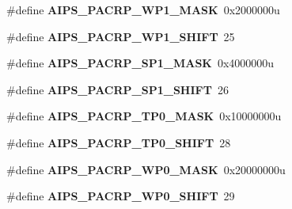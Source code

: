 \begin{DoxyCompactItemize}
\item 
\hypertarget{group___a_i_p_s___register___masks_ga28739fcab59849c84a714dc0b1ec4a01}{}\#define {\bfseries A\+I\+P\+S\+\_\+\+P\+A\+C\+R\+P\+\_\+\+W\+P1\+\_\+\+M\+A\+S\+K}~0x2000000u\label{group___a_i_p_s___register___masks_ga28739fcab59849c84a714dc0b1ec4a01}

\item 
\hypertarget{group___a_i_p_s___register___masks_ga26d8115081f73e0b31140ab74bcc3d83}{}\#define {\bfseries A\+I\+P\+S\+\_\+\+P\+A\+C\+R\+P\+\_\+\+W\+P1\+\_\+\+S\+H\+I\+F\+T}~25\label{group___a_i_p_s___register___masks_ga26d8115081f73e0b31140ab74bcc3d83}

\item 
\hypertarget{group___a_i_p_s___register___masks_ga73ee2c6cd93e9f7c8a6216bdd6ca4330}{}\#define {\bfseries A\+I\+P\+S\+\_\+\+P\+A\+C\+R\+P\+\_\+\+S\+P1\+\_\+\+M\+A\+S\+K}~0x4000000u\label{group___a_i_p_s___register___masks_ga73ee2c6cd93e9f7c8a6216bdd6ca4330}

\item 
\hypertarget{group___a_i_p_s___register___masks_ga19261bb611a66112d7d17cf1e942fa5f}{}\#define {\bfseries A\+I\+P\+S\+\_\+\+P\+A\+C\+R\+P\+\_\+\+S\+P1\+\_\+\+S\+H\+I\+F\+T}~26\label{group___a_i_p_s___register___masks_ga19261bb611a66112d7d17cf1e942fa5f}

\item 
\hypertarget{group___a_i_p_s___register___masks_ga58167e13d9a50947df0c63e79f87c9e0}{}\#define {\bfseries A\+I\+P\+S\+\_\+\+P\+A\+C\+R\+P\+\_\+\+T\+P0\+\_\+\+M\+A\+S\+K}~0x10000000u\label{group___a_i_p_s___register___masks_ga58167e13d9a50947df0c63e79f87c9e0}

\item 
\hypertarget{group___a_i_p_s___register___masks_gab7fea023f2746f87bebf27a1312ffb93}{}\#define {\bfseries A\+I\+P\+S\+\_\+\+P\+A\+C\+R\+P\+\_\+\+T\+P0\+\_\+\+S\+H\+I\+F\+T}~28\label{group___a_i_p_s___register___masks_gab7fea023f2746f87bebf27a1312ffb93}

\item 
\hypertarget{group___a_i_p_s___register___masks_ga15c748d4323aac6208af46708fda04e2}{}\#define {\bfseries A\+I\+P\+S\+\_\+\+P\+A\+C\+R\+P\+\_\+\+W\+P0\+\_\+\+M\+A\+S\+K}~0x20000000u\label{group___a_i_p_s___register___masks_ga15c748d4323aac6208af46708fda04e2}

\item 
\hypertarget{group___a_i_p_s___register___masks_ga3c468139bdd369cd7d3a4c12f0fac6cd}{}\#define {\bfseries A\+I\+P\+S\+\_\+\+P\+A\+C\+R\+P\+\_\+\+W\+P0\+\_\+\+S\+H\+I\+F\+T}~29\label{group___a_i_p_s___register___masks_ga3c468139bdd369cd7d3a4c12f0fac6cd}


\end{DoxyCompactItemize}

